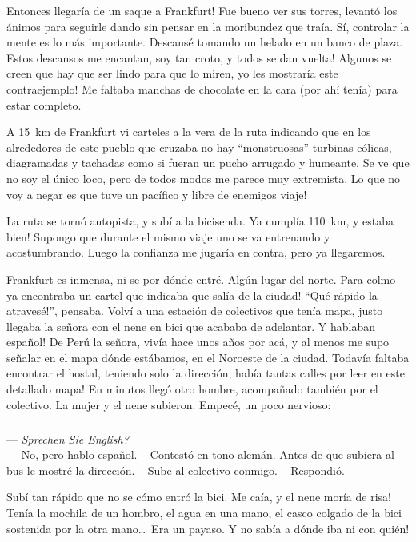 \textexclamdown Entonces llegar\'ia de un saque a Frankfurt! Fue bueno ver sus
torres, levant\'o los \'animos para seguirle dando sin pensar en la moribundez
que tra\'ia. S\'i, controlar la mente es lo m\'as importante. Descans\'e
tomando un helado en un banco de plaza. Estos descansos me encantan,
\textexclamdown soy tan croto, y todos se dan vuelta! \textexclamdown Algunos
se creen que hay que ser lindo para que lo miren, yo les mostrar\'ia este
contraejemplo! Me faltaba manchas de chocolate en la cara (por ah\'i ten\'ia)
para estar completo.

A 15~km de Frankfurt vi carteles a la vera de la ruta indicando que en los
alrededores de este pueblo que cruzaba no hay ``monstruosas'' turbinas
e\'olicas, diagramadas y tachadas como si fueran un pucho arrugado y humeante.
Se ve que no soy el \'unico loco, pero de todos modos me parece muy extremista.
\textexclamdown Lo que no voy a negar es que tuve un pac\'ifico y libre de
enemigos viaje!

La ruta se torn\'o autopista, y sub\'i a la bicisenda. \textexclamdown Ya
cumpl\'ia 110~km, y estaba bien! Supongo que durante el mismo viaje uno se va
entrenando y acostumbrando. Luego la confianza me jugar\'ia en contra, pero ya
llegaremos.

Frankfurt es inmensa, ni se por d\'onde entr\'e. Alg\'un lugar del norte.
\textexclamdown Para colmo ya encontraba un cartel que indicaba que sal\'ia de
la ciudad! ``\textexclamdown Qu\'e r\'apido la atraves\'e!'', pensaba. Volv\'i
a una estaci\'on de colectivos que ten\'ia mapa, justo llegaba la se\~nora con
el nene en bici que acababa de adelantar. \textexclamdown Y hablaban
espa\~nol! De Per\'u la se\~nora, viv\'ia hace unos a\~nos por ac\'a, y al
menos me supo se\~nalar en el mapa d\'onde est\'abamos, en el Noroeste de la
ciudad. Todav\'ia faltaba encontrar el hostal, \textexclamdown teniendo solo
la direcci\'on, hab\'ia tantas calles por leer en este detallado mapa! En
minutos lleg\'o otro hombre, acompa\~nado tambi\'en por el colectivo. La mujer
y el nene subieron. Empec\'e, un poco nervioso:

\subparagraph{}\label{ssub:habloEspanol} --- \emph{Sprechen Sie English?}\\
--- No, pero hablo espa\~nol. -- Contest\'o en tono alem\'an. Antes de que
subiera al bus le mostr\'e la direcci\'on. -- Sube al colectivo conmigo. --
Respondi\'o.\\ \hangindent=1cm

Sub\'i tan r\'apido que no se c\'omo entr\'o la bici. \textexclamdown Me
ca\'ia, y el nene mor\'ia de risa! Ten\'ia la mochila de un hombro, el agua en
una mano, el casco colgado de la bici sostenida por la otra mano\ldots\ Era un
payaso. \textexclamdown Y no sab\'ia a d\'onde iba ni con qui\'en!

